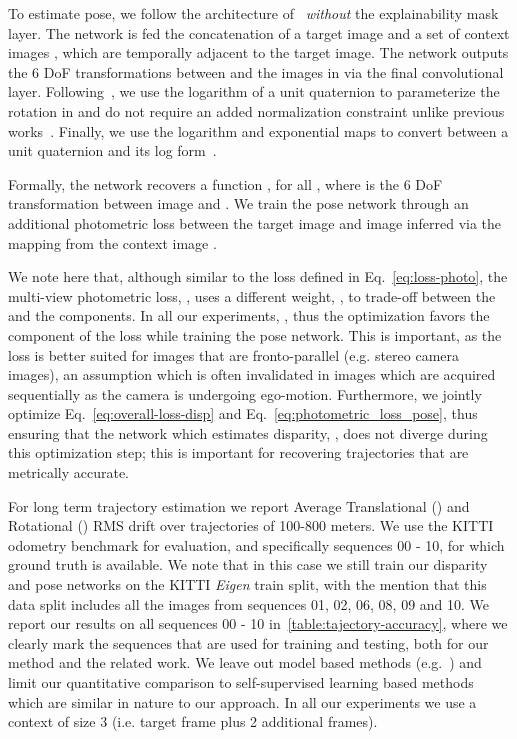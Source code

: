 \documentclass[letterpaper, 10 pt, conference]{ieeeconf}  \IEEEoverridecommandlockouts
\begin{document}
To estimate pose, we follow the architecture of~\cite{zhou2017unsupervised} \textit{without} the explainability mask layer. The network is fed the concatenation of a target image  and a set of context images , which are temporally adjacent to the target image. The network outputs the 6 DoF transformations between  and the images in  via the final  convolutional layer. Following~\cite{brahmbhatt2018geometry,clark2017vinet,grassia1998practical}, we use the logarithm of a unit quaternion to parameterize the rotation in  and do not require an added normalization constraint unlike previous works~\cite{kendall2015posenet}. Finally, we use the logarithm and exponential maps to convert between a unit quaternion  and its log form~\cite{grassia1998practical}.

Formally, the network recovers a function , for all , where   is the 6 DoF transformation between image  and . We train the pose network through an additional photometric loss between the target image  and image  inferred via the mapping  from the context image . 

We note here that, although similar to the  loss defined in Eq.~\ref{eq:loss-photo}, the multi-view photometric loss, ,  uses a different weight, , to trade-off between the  and the  components. In all our experiments, , thus the optimization favors the  component of the loss while training the pose network. This is important, as the  loss is better suited for images that are fronto-parallel (e.g. stereo camera images), an assumption which is often invalidated in images which are acquired sequentially as the camera is undergoing ego-motion. Furthermore, we jointly optimize Eq.~\ref{eq:overall-loss-disp} and Eq.~\ref{eq:photometric_loss_pose}, thus ensuring that the network which estimates disparity, , does not diverge during this optimization step; this is important for recovering trajectories that are metrically accurate.   










For long term trajectory estimation we report Average Translational () and Rotational () RMS drift over trajectories of 100-800 meters. We use the KITTI odometry benchmark for evaluation, and specifically sequences 00 - 10, for which ground truth is available. We note that in this case we still train our disparity and pose networks on the KITTI \textit{Eigen} train split, with the mention that this data split includes all the images from sequences 01, 02, 06, 08, 09 and 10. We report our results on all sequences 00 - 10 in~\ref{table:tajectory-accuracy}, where we clearly mark the sequences that are used for training and testing, both for our method and the related work. We leave out model based methods (e.g.~\cite{mur2017orb,yang2018deep}) and limit our quantitative comparison to self-supervised learning based methods which are similar in nature to our approach. In all our experiments we use a context of size 3 (i.e. target frame plus 2 additional frames).
\end{document}
